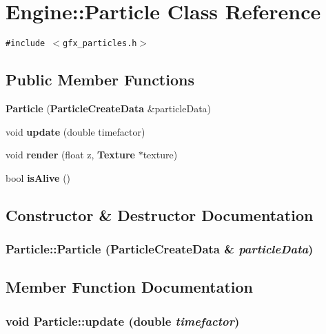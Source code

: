 \section{Engine::Particle Class Reference}
\label{classEngine_1_1Particle}
{\tt \#include $<$gfx\_\-particles.h$>$}

\subsection*{Public Member Functions}
\begin{CompactItemize}
\item 
{\bf Particle} ({\bf ParticleCreateData} \&particleData)
\item 
void {\bf update} (double timefactor)
\item 
void {\bf render} (float z, {\bf Texture} $\ast$texture)
\item 
bool {\bf isAlive} ()
\end{CompactItemize}


\subsection{Constructor \& Destructor Documentation}
\subsubsection{\setlength{\rightskip}{0pt plus 5cm}Particle::Particle ({\bf ParticleCreateData} \& {\em particleData})}\label{classEngine_1_1Particle_ba415e3107d1665c26aff55bc9335572}




\subsection{Member Function Documentation}
\subsubsection{\setlength{\rightskip}{0pt plus 5cm}void Particle::update (double {\em timefactor})}\label{classEngine_1_1Particle_8599dd034a2fd562d775edb2bdf96a7b}


